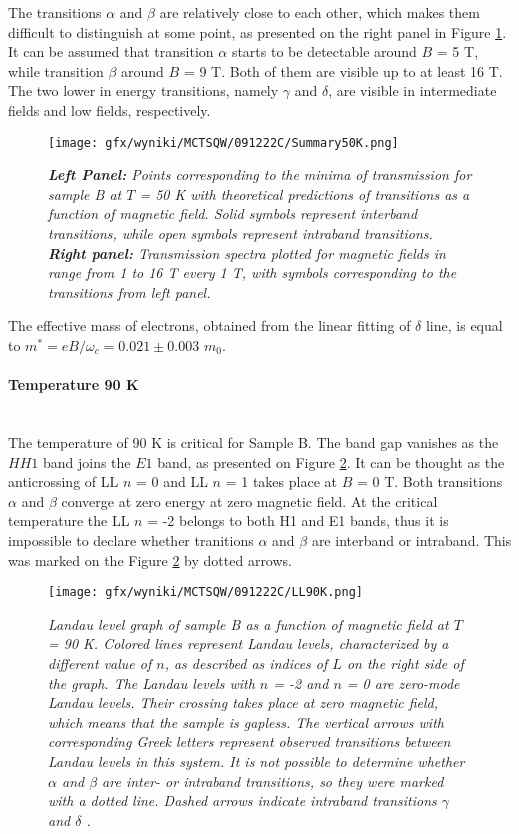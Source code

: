 \documentclass[titlepage,a4paper]{book}
\newcommand{\myparagraph}[1]{\paragraph{#1}\mbox{}\\}
\begin{document}
The transitions $\alpha$ and $\beta$ are relatively close to each other, which makes them difficult to distinguish at some point, as presented on the right panel in Figure \ref{fig:Summary_SQW_50K}. It can be assumed that transition $\alpha$ starts to be detectable around $B$ = 5 T, while transition $\beta$ around $B$ = 9 T. Both of them are visible up to at least 16 T. The two lower in energy transitions, namely $\gamma$ and $\delta$, are visible in intermediate fields and low fields, respectively.
\begin{figure}[ht]
	\centering
	\texttt{[image: gfx/wyniki/MCTSQW/091222C/Summary50K.png]}
	\vspace{-10pt}
	\caption{\textit{\textbf{Left Panel:} Points corresponding to the minima of transmission for sample B at $T$ = 50 K with theoretical predictions of transitions as a function of magnetic field. Solid symbols represent interband transitions, while open symbols represent intraband transitions. \textbf{Right panel:} Transmission spectra plotted for magnetic fields in range from 1 to 16 T every 1 T, with symbols corresponding to the transitions from left panel.}}
	\label{fig:Summary_SQW_50K}
\end{figure}

The effective mass of electrons, obtained from the linear fitting of $\delta$ line, is equal to $m^* = eB/\omega_c = 0.021 \pm 0.003$ $m_0$.

\myparagraph{Temperature 90 K}
The temperature of 90 K is critical for Sample B. The band gap vanishes as the $HH1$ band joins the $E1$ band, as presented on Figure \ref{fig:LL_SQW_90K}. It can be thought as the anticrossing of LL $n$ = 0 and LL $n$ = 1 takes place at $B$ = 0 T. Both transitions $\alpha$ and $\beta$ converge at zero energy at zero magnetic field. At the critical temperature the LL $n$ = -2 belongs to both H1 and E1 bands, thus it is impossible to declare whether tranitions $\alpha$ and $\beta$ are interband or intraband. This was marked on the Figure \ref{fig:LL_SQW_90K} by dotted arrows.
\begin{figure}[ht]
	\centering
	\texttt{[image: gfx/wyniki/MCTSQW/091222C/LL90K.png]}
	\vspace{-10pt}
	\caption{\textit{Landau level graph of sample B as a function of magnetic field at $T$ = 90 K. Colored lines represent Landau levels, characterized by a different value of $n$, as described as indices of $L$ on the right side of the graph. The Landau levels with $n$ = -2 and $n$ = 0 are zero-mode Landau levels. Their crossing takes place at zero magnetic field, which means that the sample is gapless. The vertical arrows with corresponding Greek letters represent observed transitions between Landau levels in this system. It is not possible to determine whether $\alpha$ and $\beta$ are inter- or intraband transitions, so they were marked with a dotted line. Dashed arrows indicate intraband transitions $\gamma$ and $\delta$ .}}
	\label{fig:LL_SQW_90K}
\end{figure}
\end{document}
